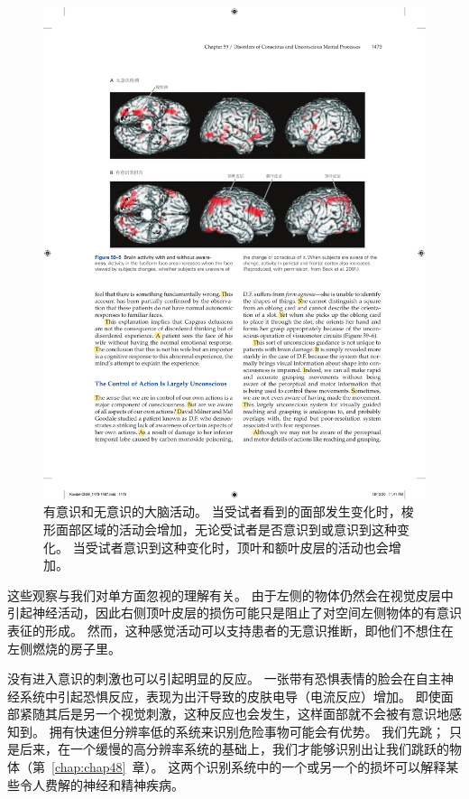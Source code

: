 \begin{figure}[htbp]
	\centering
	\includegraphics[width=1.0\linewidth]{chap59/fig_59_5}
	\caption{有意识和无意识的大脑活动。
		当受试者看到的面部发生变化时，梭形面部区域的活动会增加，无论受试者是否意识到或意识到这种变化。
		当受试者意识到这种变化时，顶叶和额叶皮层的活动也会增加\cite{beck2001neural}。}
	\label{fig:59_5}
\end{figure}


这些观察与我们对单方面忽视的理解有关。
由于左侧的物体仍然会在视觉皮层中引起神经活动，因此右侧顶叶皮层的损伤可能只是阻止了对空间左侧物体的有意识表征的形成。
然而，这种感觉活动可以支持患者的无意识推断，即他们不想住在左侧燃烧的房子里。


没有进入意识的刺激也可以引起明显的反应。
一张带有恐惧表情的脸会在自主神经系统中引起恐惧反应，表现为出汗导致的皮肤电导（电流反应）增加。
即使面部紧随其后是另一个视觉刺激，这种反应也会发生，这样面部就不会被有意识地感知到。
拥有快速但分辨率低的系统来识别危险事物可能会有优势。
我们先跳；
只是后来，在一个缓慢的高分辨率系统的基础上，我们才能够识别出让我们跳跃的物体（第~\ref{chap:chap48}~章）。
这两个识别系统中的一个或另一个的损坏可以解释某些令人费解的神经和精神疾病。


